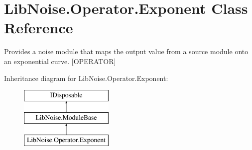 \hypertarget{class_lib_noise_1_1_operator_1_1_exponent}{}\section{Lib\+Noise.\+Operator.\+Exponent Class Reference}
\label{class_lib_noise_1_1_operator_1_1_exponent}


Provides a noise module that maps the output value from a source module onto an exponential curve. \mbox{[}O\+P\+E\+R\+A\+T\+OR\mbox{]}  


Inheritance diagram for Lib\+Noise.\+Operator.\+Exponent\+:\begin{figure}[H]
\begin{center}
\leavevmode
\includegraphics[height=3.000000cm]{class_lib_noise_1_1_operator_1_1_exponent}
\end{center}
\end{figure}
